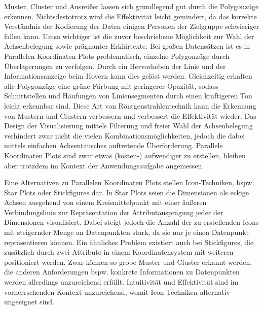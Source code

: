 \documentclass[usegeometry=true]{scrartcl}
\begin{document}
Muster, Cluster und Ausreißer lassen sich grundlegend gut durch die Polygonzüge erkennen. 
Nichtsdestotrotz wird die Effektivität leicht gemindert, da das korrekte Verständnis der Kodierung der Daten einigen Personen der Zielgruppe schwieriger fallen kann.
Umso wichtiger ist die zuvor beschriebene Möglichkeit zur Wahl der Achsenbelegung sowie prägnanter Erklärtexte.
Bei großen Datensätzen ist es in Parallelen Koordinaten Plots problematisch, einzelne Polygonzüge durch Überlagerungen zu verfolgen.
Durch ein Hervorheben der Linie und der Informationsanzeige beim Hovern kann dies gelöst werden. 
Gleichzeitig erhalten alle Polygonzüge eine grüne Färbung mit geringerer Opazität, sodass Schnittstellen und Häufungen von Liniensegmenten durch einen kräftigeren Ton leicht erkennbar sind. 
Diese Art von Röntgenstrahlentechnik kann die Erkennung von Mustern und Clustern verbessern und verbessert die Effektivität wieder.
Das Design der Visualisierung mittels Filterung und freier Wahl der Achsenbelegung verhindert zwar nicht die vielen Kombinationsmöglichkeiten, jedoch die dabei mittels einfachen Achsentausches auftretende Überforderung.
Parallele Koordinaten Plots sind zwar etwas (kosten-) aufwendiger zu erstellen, bleiben aber trotzdem im Kontext der Anwendungsaufgabe angemessen.

Eine Alternativen zu Parallelen Koordinaten Plots stellen Icon-Techniken, bspw. Star Plots oder Stickfigures dar.
In Star Plots seien die Dimensionen als eckige Achsen ausgehend von einem Kreismittelpunkt mit einer äußeren Verbindungslinie zur Repräsentation der Attributausprägung jeder der Dimensionen visualisiert.
Dabei steigt jedoch die Anzahl der zu erstellenden Icons mit steigernder Menge an Datenpunkten stark, da sie nur je einen Datenpunkt repräsentieren können.\cite[20]{Chan.2006}
Ein ähnliches Problem existiert auch bei Stickfigures, die zusätzlich durch zwei Attribute in einem Koordinatensystem mit weiteren positioniert werden.
Zwar können so grobe Muster und Cluster erkannt werden, die anderen Anforderungen bspw. konkrete Informationen zu Datenpunkten werden allerdings unzureichend erfüllt.
Intuitivität und Effektivität sind im vorherrschenden Kontext unzureichend, womit Icon-Techniken alternativ ungeeignet sind. 
\end{document}
